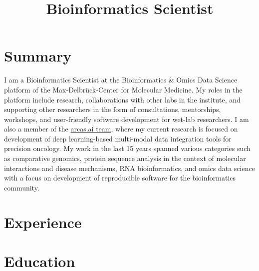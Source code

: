 \documentclass[11pt,a4paper,sans]{moderncv}
\title{Bioinformatics Scientist}                   %
\begin{document}
\makecvtitle

\section{Summary}
I am a Bioinformatics Scientist at the Bioinformatics \& Omics Data Science platform of the Max-Delbrück-Center for Molecular Medicine. My roles in the platform include research, collaborations with other labs in the institute, and supporting other researchers in the form of consultations, mentorships, workshops, and user-friendly software development for wet-lab researchers. I am also a member of the \href{https://arcas.ai/about-us}{arcas.ai team}, where my current research is focused on development of deep learning-based multi-modal data integration tools for precision oncology. My work in the last 15 years spanned various categories such as comparative genomics, protein sequence analysis in the context of molecular interactions and disease mechanisms, RNA bioinformatics, and omics data science with a focus on development of reproducible software for the bioinformatics community.

\section{Experience}


\section{Education}
\end{document}
